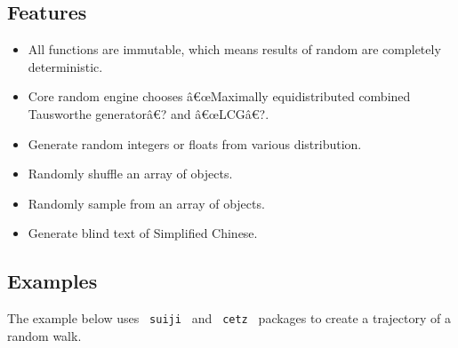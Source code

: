 \subsection{Features}\label{features}

\begin{itemize}
\tightlist
\item
  All functions are immutable, which means results of random are
  completely deterministic.
\item
  Core random engine chooses â€œMaximally equidistributed combined
  Tausworthe generatorâ€? and â€œLCGâ€?.
\item
  Generate random integers or floats from various distribution.
\item
  Randomly shuffle an array of objects.
\item
  Randomly sample from an array of objects.
\item
  Generate blind text of Simplified Chinese.
\end{itemize}

\subsection{Examples}\label{examples}

The example below uses \texttt{\ suiji\ } and \texttt{\ cetz\ } packages
to create a trajectory of a random walk.

\begin{Shaded}
\begin{Highlighting}[]




\NormalTok{    )}
\NormalTok{  \}}
\NormalTok{\})}
\end{Highlighting}
\end{Shaded}

